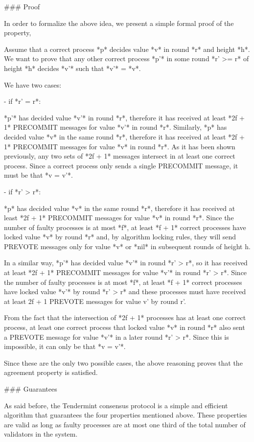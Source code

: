 \documentclass[a4paper,11pt,oneside]{report}
\begin{document}
\begin{markdown}
### Proof

In order to formalize the above idea, we present a simple formal proof of the property,

Assume that a correct process *p* decides value *v* in round *r* and height *h*. We want to prove that any other correct process *p'* in some round *r' >= r* of height *h* decides *v'* such that *v'* = *v*.

We have two cases:

- if *r' = r*: 

    *p'* has decided value *v'* in round *r*, therefore it has received at least *2f + 1* PRECOMMIT messages for value *v'* in round *r*. 
    Similarly, *p* has decided value *v* in the same round *r*, therefore it has received at least *2f + 1* PRECOMMIT messages for value *v* in round *r*. 
    As it has been shown previously, any two sets of *2f + 1* messages intersect in at least one correct process. Since a correct process only sends a single PRECOMMIT message, it must be that *v = v'*.  

- if *r' > r*:
        
    *p* has decided value *v* in the same round *r*, therefore it has received at least *2f + 1* PRECOMMIT messages for value *v* in round *r*.
    Since the number of faulty processes is at most *f*, at least *f + 1* correct processes have locked value *v* by round *r* and, by algorithm locking rules, they will send PREVOTE messages only for value *v* or *nil* in subsequent rounds of height h.
    
    In a similar way, *p'* has decided value *v'* in round *r' > r*, so it has received at least *2f + 1* PRECOMMIT messages for value *v'* in round *r' > r*. 
    Since the number of faulty processes is at most *f*, at least *f + 1* correct processes have locked value *v'* by round *r' > r* and these processes must have received at least 2f + 1 PREVOTE messages for value v' by round r'.
    
    From the fact that the intersection of *2f + 1* processes has at least one correct process, at least one correct process that locked value *v* in round *r* also sent a PREVOTE message for value *v'* in a later round *r' > r*. 
    Since this is impossible, it can only be that *v = v'*.

Since these are the only two possible cases, the above reasoning proves that the agreement property is satisfied.

### Guarantees 

As said before, the Tendermint consensus protocol is a simple and efficient algorithm that guarantees the four properties mentioned above. These properties are valid as long as faulty processes are at most one third of the total number of validators in the system.


\end{markdown}
\end{document}
